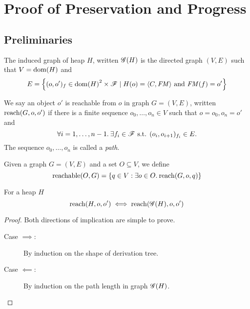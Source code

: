 \chapter{Proof of Preservation and Progress}
\label{cha:proof_of_pnp}

\section{Preliminaries}%
\label{sec:preliminaries}

\begin{definition}
  The induced graph of heap $H$, written $\mathscr{G}{(H)}$ is the directed graph
  $(V, E)$ such that $V = \mbox{$\mathrm{dom}$}{(H)}$ and 
  \begin{equation}
    E = \left\{ (o, o')_f \in \mbox{$\mathrm{dom}$}{(H)}^2 \times \mathscr{F} \mid
      H(o) = \mbox{$\langle C, \mathit{FM} \rangle$} \text{ and } \mathit{FM}(f) = o' \right\}
  \end{equation}
\end{definition}

\begin{definition}
  We say an object $o'$ is reachable from $o$ in graph $G = (V,
  E)$, written $\mbox{$\mathrm{reach}$}{(G, o, o')}$ if there is a finite sequence $o_0, \dots,
  o_n \in V$ such that $o = o_0, o_n = o'$ and
  \begin{equation}
    \forall i = 1,\dots, n-1. \: \exists f_i \in \mathscr{F} \text{ s.t. } (o_i,
    o_{i+1})_{f_i} \in E.
  \end{equation}
  The sequence $o_0, \dots, o_n$ is called a \emph{path}.
\end{definition}

\begin{definition}
  Given a graph $G = (V, E)$ and a set $O \subseteq V$, we define
  \begin{equation}
    \mbox{$\mathrm{reachable}$}{(O, G)} = \left\{ q \in V: \exists o\in O.\: \mbox{$\mathrm{reach}$}{(G, o, q)}
    \right\} \notag
  \end{equation}
\end{definition}

\begin{proposition}
  \label{prop:reacheq}
  For a heap $H$ 
  \begin{equation}
    \mbox{$\mathrm{reach}$}{(H, o, o')} \iff \mbox{$\mathrm{reach}$}{(\ensuremath{\mathscr{G}}{(H)}, o, o')}
  \end{equation}
\end{proposition}

\begin{proof}
  Both directions of implication are simple to prove.
  \begin{description}
    \item[Case $\implies$:] By induction on the shape of derivation tree.
    \item[Case $\impliedby$:] By induction on the path length in graph
      $\mathscr{G}{(H)}$.
  \end{description}
\end{proof}

